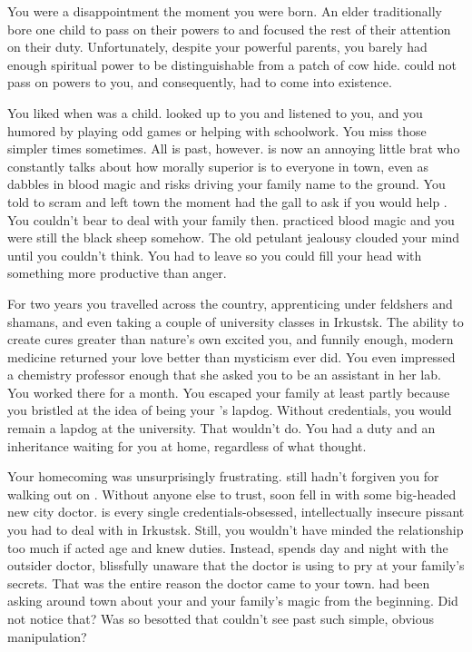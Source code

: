 \documentclass[char]{Pestilence}
\begin{document}
\name{\cApprentice{}}

You were a disappointment the moment you were born. An elder traditionally bore one child to pass on their powers to and focused the rest of their attention on their duty. Unfortunately, despite your powerful parents, you barely had enough spiritual power to be distinguishable from a patch of cow hide. \cElder{\Parent} could not pass on \cElder{\their} powers to you, and consequently, \cRebel{} had to come into existence.

You liked \cRebel{} when \cRebel{\they} was a child. \cRebel{\They} looked up to you and listened to you, and you humored \cRebel{\them} by playing \cRebel{\their} odd games or helping with \cRebel{\their} schoolwork. You miss those simpler times sometimes. All is past, however. \cRebel{} is now an annoying little brat who constantly talks about how morally superior \cRebel{\they} is to everyone in town, even as \cRebel{\they} dabbles in blood magic and risks driving your family name to the ground. You told \cRebel{\them} to scram and left town the moment \cRebel{\they} had the gall to ask if you would help \cRebel{\them}. You couldn't bear to deal with your family then. \cRebel{} practiced blood magic and you were still the black sheep somehow. The old petulant jealousy clouded your mind until you couldn't think. You had to leave so you could fill your head with something more productive than anger.

For two years you travelled across the country, apprenticing under feldshers and shamans, and even taking a couple of university classes in Irkustsk. The ability to create cures greater than nature's own excited you, and funnily enough, modern medicine returned your love better than mysticism ever did. You even impressed a chemistry professor enough that she asked you to be an assistant in her lab. You worked there for a month. You escaped your family at least partly because you bristled at the idea of being your \cRebel{\sibling}'s lapdog. Without credentials, you would remain a lapdog at the university. That wouldn't do. You had a duty and an inheritance waiting for you at home, regardless of what \cElder{\Parent} thought.

Your homecoming was unsurprisingly frustrating. \cRebel{} still hadn't forgiven you for walking out on \cRebel{\them}. Without anyone else to trust, \cRebel{\they} soon fell in with some big-headed new city doctor. \cOutsider{} is every single credentials-obsessed, intellectually insecure pissant you had to deal with in Irkustsk. Still, you wouldn't have minded the relationship too much if \cRebel{} acted \cRebel{\their} age and knew \cRebel{\their} duties. Instead, \cRebel{\they} spends day and night with the outsider doctor, blissfully unaware that the doctor is using \cRebel{\them} to pry at your family's secrets. That was the entire reason the doctor came to your town. \cOutsider{\They} had been asking around town about your \cElder{\parent} and your family's magic from the beginning. Did \cRebel{} not notice that? Was \cRebel{\they} so besotted that \cRebel{\they} couldn't see past such simple, obvious manipulation?
\end{document}
